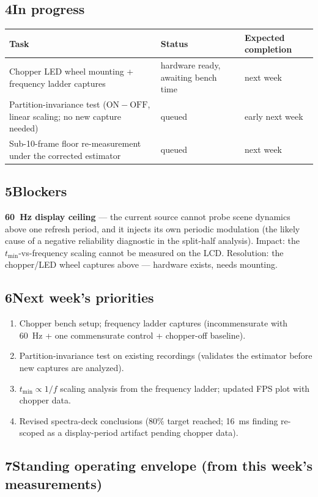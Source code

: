 \documentclass[11pt,a4paper]{article}
\newcommand{\heading}[1]{\subsection*{\color{reportblue}#1}}
\begin{document}
\heading{4\quad In progress}

\begin{table}[h!]
\centering
\renewcommand{\arraystretch}{1.2}
\begin{tabular}{@{}p{7.6cm}p{4.2cm}p{4.2cm}@{}}
\toprule
\textsf{Task} & \textsf{Status} & \textsf{Expected completion} \\
\midrule
Chopper LED wheel mounting + frequency ladder captures & hardware ready, awaiting bench time & next week \\
Partition-invariance test ($\mathrm{ON}-\mathrm{OFF}$, linear scaling; no new capture needed) & queued & early next week \\
Sub-10-frame floor re-measurement under the corrected estimator & queued & next week \\
\bottomrule
\end{tabular}
\end{table}

\heading{5\quad Blockers}

\textbf{60~Hz display ceiling} --- the current source cannot probe scene dynamics above one
refresh period, and it injects its own periodic modulation (the likely cause of a negative
reliability diagnostic in the split-half analysis). Impact: the $t_{\min}$-vs-frequency
scaling cannot be measured on the LCD. Resolution: the chopper/LED wheel captures above ---
hardware exists, needs mounting.

\heading{6\quad Next week's priorities}

\begin{enumerate}
\item Chopper bench setup; frequency ladder captures (incommensurate with 60~Hz + one
commensurate control + chopper-off baseline).
\item Partition-invariance test on existing recordings (validates the estimator before new
captures are analyzed).
\item $t_{\min} \propto 1/f$ scaling analysis from the frequency ladder; updated FPS plot
with chopper data.
\item Revised spectra-deck conclusions ($80\%$ target reached; 16~ms finding re-scoped as a
display-period artifact pending chopper data).
\end{enumerate}

\heading{7\quad Standing operating envelope (from this week's measurements)}

\begin{center}
\renewcommand{\arraystretch}{1.2}
\end{center}
\end{document}

